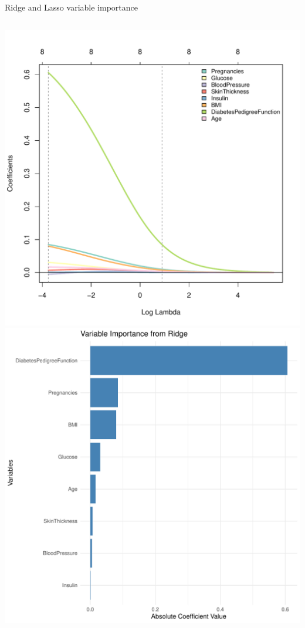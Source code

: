 \begin{frame}{Ridge and Lasso variable importance}
\begin{columns}[T]
\begin{column}{0.5\textwidth}
\includegraphics[width=0.85\columnwidth]{plots/diabetes_ridge.pdf}
\includegraphics[width=0.7\columnwidth]{plots/variable_importance_ridge.pdf}
\end{column}
\end{columns}

\end{frame}

